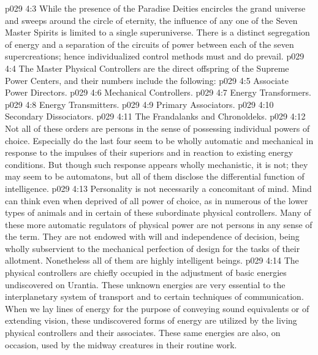 \vs p029 4:3 While the presence of the Paradise Deities encircles the grand universe and sweeps around the circle of eternity, the influence of any one of the Seven Master Spirits is limited to a single superuniverse. There is a distinct segregation of energy and a separation of the circuits of power between each of the seven supercreations; hence individualized control methods must and do prevail.\plusone
\pc \vs p029 4:4 The Master Physical Controllers are the direct offspring of the Supreme Power Centers, and their numbers include the following:
\pc \vs p029 4:5 \bibnobreakspace Associate Power Directors.
\vs p029 4:6 \bibnobreakspace Mechanical Controllers.
\vs p029 4:7 \bibnobreakspace Energy Transformers.
\vs p029 4:8 \bibnobreakspace Energy Transmitters.
\vs p029 4:9 \bibnobreakspace Primary Associators.
\vs p029 4:10 \bibnobreakspace Secondary Dissociators.
\vs p029 4:11 \bibnobreakspace The Frandalanks and Chronoldeks.
\pc \vs p029 4:12 Not all of these orders are persons in the sense of possessing individual powers of choice. Especially do the last four seem to be wholly automatic and mechanical in response to the impulses of their superiors and in reaction to existing energy conditions. But though such response appears wholly mechanistic, it is not; they may seem to be automatons, but all of them disclose the differential function of intelligence.
\vs p029 4:13 Personality is not necessarily a concomitant of mind. Mind can think even when deprived of all power of choice, as in numerous of the lower types of animals and in certain of these subordinate physical controllers. Many of these more automatic regulators of physical power are not persons in any sense of the term. They are not endowed with will and independence of decision, being wholly subservient to the mechanical perfection of design for the tasks of their allotment. Nonetheless all of them are highly intelligent beings.
\vs p029 4:14 The physical controllers are chiefly occupied in the adjustment of basic energies undiscovered on Urantia. These unknown energies are very essential to the interplanetary system of transport and to certain techniques of communication. When we lay lines of energy for the purpose of conveying sound equivalents or of extending vision, these undiscovered forms of energy are utilized by the living physical controllers and their associates. These same energies are also, on occasion, used by the midway creatures in their routine work.
